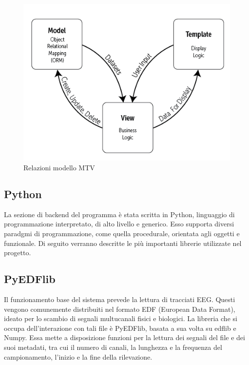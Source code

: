 \documentclass{article}
\begin{document}
\begin{figure}[!h]
\centering
\includegraphics[scale=0.5]{mtv}
\caption{Relazioni modello MTV}
\end{figure}

\subsection{Python}
La sezione di backend del programma è stata scritta in Python, linguaggio di programmazione interpretato, di alto livello e generico.
Esso supporta diversi paradgmi di programmazione, come quella procedurale, orientata agli oggetti e funzionale. 
Di seguito verranno descritte le più importanti librerie utilizzate nel progetto.

\subsection{PyEDFlib}
Il funzionamento base del sistema prevede la lettura di tracciati EEG. Questi vengono comunemente distribuiti nel formato EDF (European Data Format), ideato per lo scambio di segnali multucanali fisici e biologici. La libreria che si occupa dell'interazione con tali file è PyEDFlib, basata a sua volta su edflib e Numpy. Essa mette a disposizione funzioni per la lettura dei segnali del file e dei suoi metadati, tra cui il numero di canali, la lunghezza e la frequenza del campionamento, l'inizio e la fine della rilevazione. 
\end{document}
